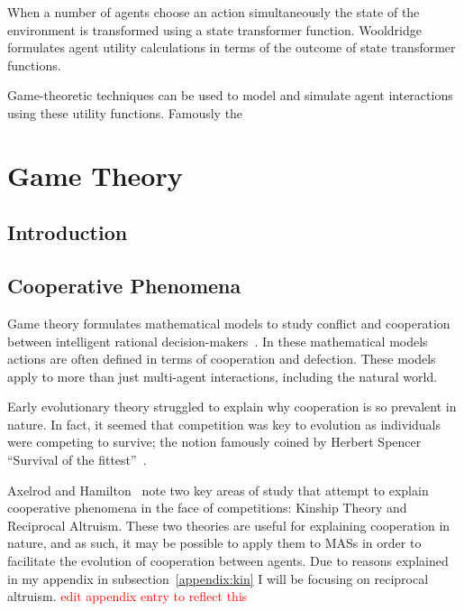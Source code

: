 \documentclass[]{final_report}
\begin{document}
When a number of agents choose an action simultaneously the state of the environment is transformed using a state transformer function. Wooldridge~\cite{wooldridge2009introduction} formulates agent utility calculations in terms of the outcome of state transformer functions.\par 
Game-theoretic techniques can be used to model and simulate agent interactions using these utility functions. Famously the 

\section{Game Theory}
\label{sec:backgroundgametheory}
\subsection{Introduction}

\subsection{Cooperative Phenomena}
Game theory formulates mathematical models to study conflict and cooperation between intelligent rational decision-makers~\cite{myerson2013game}. In these mathematical models actions are often defined in terms of cooperation and defection. These models apply to more than just multi-agent interactions, including the natural world.\par 
Early evolutionary theory struggled to explain why cooperation is so prevalent in nature. In fact, it seemed that competition was key to evolution as individuals were competing to survive; the notion famously coined by Herbert Spencer ``Survival of the fittest''~\cite{spencer1864principles}.\par
Axelrod and Hamilton~\cite{evolution_of_cooperation} note two key areas of study that attempt to explain cooperative phenomena in the face of competitions: Kinship Theory and Reciprocal Altruism. These two theories are useful for explaining cooperation in nature, and as such, it may be possible to apply them to MASs in order to facilitate the evolution of cooperation between agents. Due to reasons explained in my appendix in subsection~\ref{appendix:kin} I will be focusing on reciprocal altruism.
\textcolor{red}{edit appendix entry to reflect this}
\end{document}
